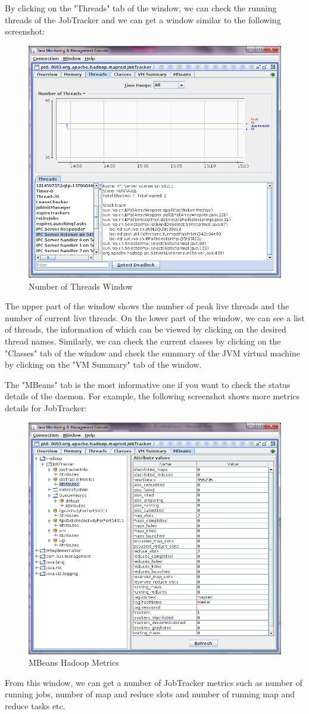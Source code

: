 By clicking on the "Threads" tab of the window, we can check the running threads of the JobTracker and we can get a window similar to the following screenshot:
\begin{figure}[ht]
  \centering
  \includegraphics[width=.7\textwidth]{figs/5163os_06_04.png}
  \caption{Number of Threads Window}\label{fig:num.threads}
\end{figure} 
The upper part of the window shows the number of peak live threads and the number of current live threads. On the lower part of the window, we can see a list of threads, the information of which can be viewed by clicking on the desired thread names.
Similarly, we can check the current classes by clicking on the "Classes" tab of the window and check the summary of the JVM virtual machine by clicking on the "VM Summary" tab of the window.

The "MBeans" tab is the most informative one if you want to check the status details of the daemon. For example, the following screenshot shows more metrics details for JobTracker:
\begin{figure}[ht]
  \centering
  \includegraphics[width=.7\textwidth]{figs/5163os_06_05.png}
  \caption{MBeans Hadoop Metrics}\label{fig:mbeans.hadoop.metrics}
\end{figure} 
From this window, we can get a number of JobTracker metrics such as number of running jobs, number of map and reduce slots and number of running map and reduce tasks etc.
